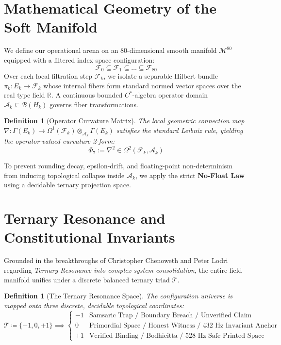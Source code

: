 \documentclass[11pt,oneside,letterpaper]{article}
\newtheorem{definition}[theorem]{Definition}
\newcommand{\M}{\mathcal{M}^{80}}
\newcommand{\F}{\mathcal{F}_k}
\newcommand{\A}{\mathcal{A}_k}
\newcommand{\trit}{\mathcal{T}}
\begin{document}
\section{Mathematical Geometry of the Soft Manifold}
We define our operational arena on an 80-dimensional smooth manifold $\M$ equipped with a filtered index space configuration:
\begin{equation}
\mathcal{F}_0 \subseteq \mathcal{F}_1 \subseteq \dots \subseteq \mathcal{F}_{80}
\end{equation}
Over each local filtration step $\F$, we isolate a separable Hilbert bundle $\pi_k: E_k \to \F$ whose internal fibers form standard normed vector spaces over the real type field $\mathbb{R}$. A continuous bounded $C^*$-algebra operator domain $\A \subseteq \mathcal{B}(H_k)$ governs fiber transformations.

\begin{definition}[Operator Curvature Matrix]
The local geometric connection map $\nabla: \Gamma(E_k) \to \Omega^1(\F) \otimes_{\A} \Gamma(E_k)$ satisfies the standard Leibniz rule, yielding the operator-valued curvature 2-form:
\begin{equation}
\Phi_7 := \nabla^2 \in \Omega^2(\F, \A)
\end{equation}
\end{definition}

To prevent rounding decay, epsilon-drift, and floating-point non-determinism from inducing topological collapse inside $\A$, we apply the strict \textbf{No-Float Law} using a decidable ternary projection space.

\section{Ternary Resonance and Constitutional Invariants}
Grounded in the breakthroughs of Christopher Chenoweth and Peter Lodri regarding \textit{Ternary Resonance into complex system consolidation}, the entire field manifold unifies under a discrete balanced ternary triad $\trit$.

\begin{definition}[The Ternary Resonance Space]
The configuration universe is mapped onto three discrete, decidable topological coordinates:
\begin{equation}
\trit \coloneqq \{-1, 0, +1\} \implies 
\begin{cases}
-1 & \text{Samsaric Trap / Boundary Breach / Unverified Claim} \\
0  & \text{Primordial Space / Honest Witness / 432~Hz Invariant Anchor} \\
+1 & \text{Verified Binding / Bodhicitta / 528~Hz Safe Printed Space}
\end{cases}
\end{equation}
\end{definition}
\end{document}
